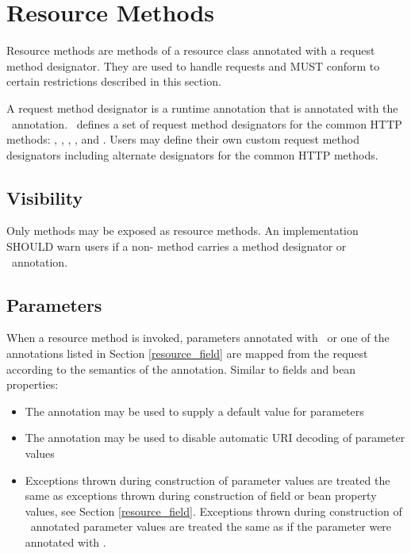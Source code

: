 \section{Resource Methods}
\label{resource_method}

Resource methods are methods of a resource class annotated with a request method designator. They are used to handle requests and MUST conform to certain restrictions described in this section.

A request method designator is a runtime annotation that is annotated with the \HttpMethod\ annotation. \jaxrs\ defines a set of request method designators for the common HTTP methods: , , , ,  and . Users may define their own custom request method designators including alternate designators for the common HTTP methods.

\subsection{Visibility}
\label{visibility}

Only  methods may be exposed as resource methods. An implementation SHOULD warn users if a non- method carries a method designator or \Path\ annotation.

\subsection{Parameters}
\label{resource_method_params}

When a resource method is invoked, parameters annotated with \FormParam\ or one of the  annotations listed in Section \ref{resource_field} are mapped from the request according to the semantics of the annotation. Similar to fields and bean properties:
\begin{itemize}
\item The  annotation may be used to supply a default value for parameters
\item The  annotation may be used to disable automatic URI decoding of parameter values
\item Exceptions thrown during construction of parameter values are treated the same as exceptions thrown during construction of field or bean property values, see Section \ref{resource_field}. Exceptions thrown during construction of \FormParam\ annotated parameter values are treated the same as if the parameter were annotated with \HeaderParam.
\end{itemize}

